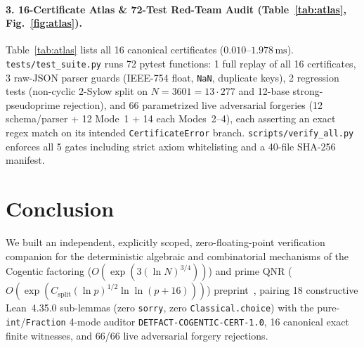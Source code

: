 \documentclass[10pt,twocolumn]{article}
\begin{document}
\paragraph{3. 16-Certificate Atlas \& 72-Test Red-Team Audit (Table~\ref{tab:atlas}, Fig.~\ref{fig:atlas}).}
Table~\ref{tab:atlas} lists all 16 canonical certificates ($0.010$--$1.978\,\mathrm{ms}$). \texttt{tests/test\_\allowbreak suite.py} runs 72 pytest functions: 1 full replay of all 16 certificates, 3 raw-JSON parser guards (IEEE-754 float, \texttt{NaN}, duplicate keys), 2 regression tests (non-cyclic 2-Sylow split on $N=3601=13\cdot 277$ and 12-base strong-pseudoprime rejection), and 66 parametrized live adversarial forgeries (12 schema/parser + 12 Mode~1 + 14 each Modes~2--4), each asserting an exact regex match on its intended \texttt{CertificateError} branch. \texttt{scripts/verify\_\allowbreak all.py} enforces all 5 gates including strict axiom whitelisting and a 40-file SHA-256 manifest.

\section{Conclusion}\label{sec:conc}
We built an independent, explicitly scoped, zero-floating-point verification companion for the deterministic algebraic and combinatorial mechanisms of the Cogentic factoring ($O(\exp(3(\ln N)^{3/4}))$) and prime QNR ($O(\exp(C_{\mathrm{split}}(\ln p)^{1/2}\ln\ln(p+16)))$) preprint~\cite{cogentic2026detfactoring,cai2026cogentic}, pairing 18 constructive Lean~4.35.0 sub-lemmas (zero \texttt{sorry}, zero \texttt{Classical.choice}) with the pure-\texttt{int}/\texttt{Fraction} 4-mode auditor \texttt{DETFACT-\allowbreak COGENTIC-\allowbreak CERT-1.0}, 16 canonical exact finite witnesses, and 66/66 live adversarial forgery rejections.

{\footnotesize

}
\end{document}
